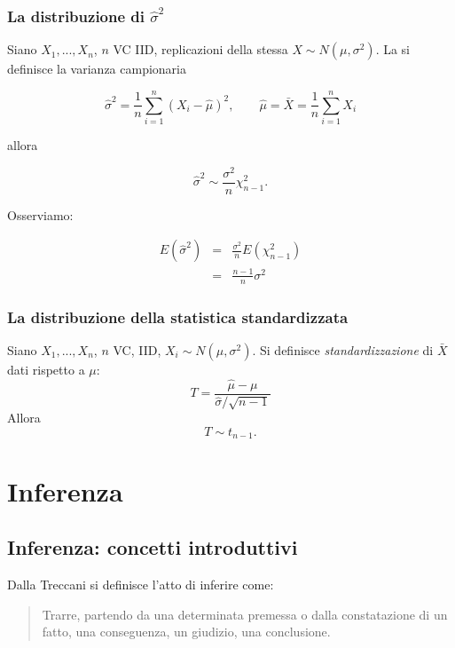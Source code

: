 \documentclass[
  11pt,
]{book}
\theoremstyle{mytheoremstyle}
\theoremstyle{mydefstyle}
\begin{document}
\section{\texorpdfstring{La distribuzione di \(\hat\sigma^2\)}{La distribuzione di \textbackslash hat\textbackslash sigma\^{}2}}\label{la-distribuzione-di-hatsigma2}

Siano \(X_1,...,X_n\), \(n\) VC IID, replicazioni della stessa \(X\sim N(\mu,\sigma^2)\).
La si definisce la varianza campionaria

\[\hat\sigma^2=\frac 1 n \sum_{i=1}^n(X_i-\hat \mu)^2, \qquad \hat \mu=\bar X=\frac 1 n \sum_{i=1}^nX_i\]

allora

\[ \hat\sigma^2\sim\frac{\sigma^2}n\chi^2_{n-1}.\]

Osserviamo:

\begin{eqnarray*}
E(\hat\sigma^2) &=& \frac {\sigma^2}n E(\chi^2_{n-1})\\
                &=& \frac{n-1}n \sigma^2
\end{eqnarray*}

\section{La distribuzione della statistica standardizzata}\label{la-distribuzione-della-statistica-standardizzata}

Siano \(X_1,...,X_n\), \(n\) VC, IID, \(X_i\sim N(\mu,\sigma^2)\). Si definisce \emph{standardizzazione} di \(\bar X\) dati rispetto a \(\mu\):
\[T=\frac{\hat \mu-\mu}{{\hat\sigma}/{\sqrt{n-1}}}\]
Allora
\[T\sim t_{n-1}. \]

\part{Inferenza}

\chapter{Inferenza: concetti introduttivi}\label{inferenza-concetti-introduttivi}

Dalla Treccani si definisce l'atto di inferire come:

\begin{quote}
Trarre, partendo da una determinata premessa o dalla constatazione di un fatto, una conseguenza, un giudizio, una conclusione.
\end{quote}
\end{document}

